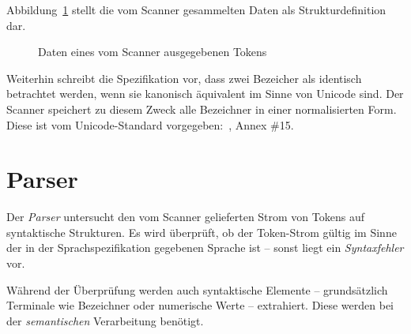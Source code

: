 \documentclass[twoside,a4paper,fleqn,12pt]{book}
\begin{document}
Abbildung~\ref{fig:LexerToken} stellt die vom Scanner gesammelten Daten als Strukturdefinition dar.

\begin{figure}[h]
   \centering
  
  \caption{Daten eines vom Scanner ausgegebenen Tokens}
  \label{fig:LexerToken}
\end{figure}



Weiterhin schreibt die Spezifikation vor, dass zwei Bezeicher als identisch betrachtet werden, wenn sie kanonisch äquivalent im Sinne von Unicode sind.
Der Scanner speichert zu diesem Zweck alle Bezeichner in einer normalisierten Form. Diese ist vom Unicode-Standard vorgegeben:~\cite{unicode}, Annex \#15.

\section{Parser}

Der \emph{Parser} untersucht den vom Scanner gelieferten Strom von Tokens auf syntaktische Strukturen.
Es wird überprüft, ob der Token-Strom gültig im Sinne der in der Sprachspezifikation gegebenen Sprache ist --
sonst liegt ein \emph{Syntaxfehler} vor.

Während der Überprüfung werden auch syntaktische Elemente -- grundsätzlich Terminale wie Bezeichner oder numerische Werte -- extrahiert.
Diese werden bei der \emph{semantischen} Verarbeitung benötigt.



\end{document}
